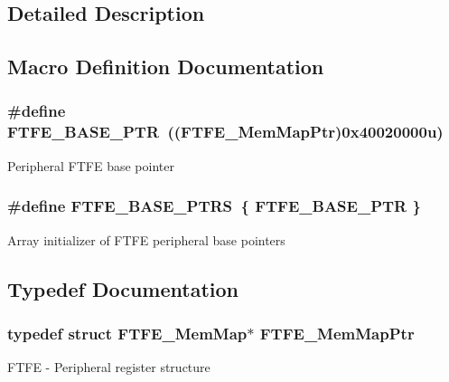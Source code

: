 \subsection{Detailed Description}


\subsection{Macro Definition Documentation}
\hypertarget{group___f_t_f_e___peripheral_ga459f4097b9fd3f09e7bf790c17831f83}{}
\subsubsection[{F\+T\+F\+E\+\_\+\+B\+A\+S\+E\+\_\+\+P\+T\+R}]{\setlength{\rightskip}{0pt plus 5cm}\#define F\+T\+F\+E\+\_\+\+B\+A\+S\+E\+\_\+\+P\+T\+R~(({\bf F\+T\+F\+E\+\_\+\+Mem\+Map\+Ptr})0x40020000u)}\label{group___f_t_f_e___peripheral_ga459f4097b9fd3f09e7bf790c17831f83}
Peripheral F\+T\+F\+E base pointer \hypertarget{group___f_t_f_e___peripheral_ga5ae2dee20c785365da3d603faf7a1dd2}{}
\subsubsection[{F\+T\+F\+E\+\_\+\+B\+A\+S\+E\+\_\+\+P\+T\+R\+S}]{\setlength{\rightskip}{0pt plus 5cm}\#define F\+T\+F\+E\+\_\+\+B\+A\+S\+E\+\_\+\+P\+T\+R\+S~\{ {\bf F\+T\+F\+E\+\_\+\+B\+A\+S\+E\+\_\+\+P\+T\+R} \}}\label{group___f_t_f_e___peripheral_ga5ae2dee20c785365da3d603faf7a1dd2}
Array initializer of F\+T\+F\+E peripheral base pointers 

\subsection{Typedef Documentation}
\hypertarget{group___f_t_f_e___peripheral_gad81b9269a2ee19ce1983daae49ba1694}{}
\subsubsection[{F\+T\+F\+E\+\_\+\+Mem\+Map\+Ptr}]{\setlength{\rightskip}{0pt plus 5cm}typedef struct {\bf F\+T\+F\+E\+\_\+\+Mem\+Map}$\ast$ {\bf F\+T\+F\+E\+\_\+\+Mem\+Map\+Ptr}}\label{group___f_t_f_e___peripheral_gad81b9269a2ee19ce1983daae49ba1694}
F\+T\+F\+E -\/ Peripheral register structure 